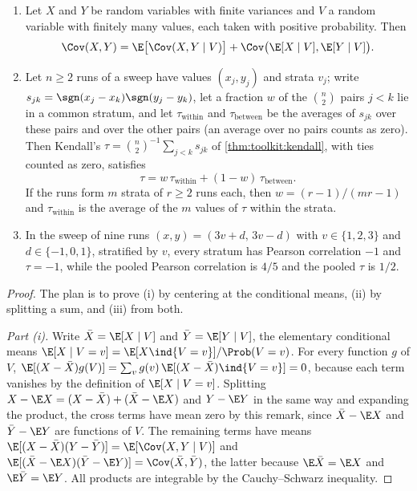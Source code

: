 \begin{refsection}
\begin{proposition}\label{prop:sharpness:simpson}
\begin{enumerate}
\item Let $X$ and $Y$ be random variables with finite variances and $V$ a random variable with finitely many values, each taken with positive probability. Then
\[
\Cov(X,Y)=\E\bigl[\Cov(X,Y\mid V)\bigr]+\Cov\bigl(\E[X\mid V],\E[Y\mid V]\bigr).
\]
\item Let $n\ge2$ runs of a sweep have values $(x_j,y_j)$ and strata $v_j$; write $s_{jk}=\sgn(x_j-x_k)\sgn(y_j-y_k)$, let a fraction $w$ of the $\binom n2$ pairs $j<k$ lie in a common stratum, and let $\tau_{\mathrm{within}}$ and $\tau_{\mathrm{between}}$ be the averages of $s_{jk}$ over these pairs and over the other pairs (an average over no pairs counts as zero). Then Kendall's $\tau=\binom n2^{-1}\sum_{j<k}s_{jk}$ of \cref{thm:toolkit:kendall}, with ties counted as zero, satisfies
\begin{equation}\label{eq:sharpness:pairs}
\tau=w\,\tau_{\mathrm{within}}+(1-w)\,\tau_{\mathrm{between}}.
\end{equation}
If the runs form $m$ strata of $r\ge2$ runs each, then $w=(r-1)/(mr-1)$ and $\tau_{\mathrm{within}}$ is the average of the $m$ values of $\tau$ within the strata.
\item In the sweep of nine runs $(x,y)=(3v+d,\,3v-d)$ with $v\in\{1,2,3\}$ and $d\in\{-1,0,1\}$, stratified by $v$, every stratum has Pearson correlation $-1$ and $\tau=-1$, while the pooled Pearson correlation is $4/5$ and the pooled $\tau$ is $1/2$.
\end{enumerate}
\end{proposition}

\begin{proof}
The plan is to prove (i) by centering at the conditional means, (ii) by splitting a sum, and (iii) from both.

\emph{Part (i).} Write $\bar X=\E[X\mid V]$ and $\bar Y=\E[Y\mid V]$, the elementary conditional means $\E[X\mid V=v]=\E[X\ind\{V=v\}]/\Prob(V=v)$. For every function $g$ of $V$, $\E[(X-\bar X)g(V)]=\sum_vg(v)\,\E[(X-\bar X)\ind\{V=v\}]=0$, because each term vanishes by the definition of $\E[X\mid V=v]$. Splitting $X-\E X=(X-\bar X)+(\bar X-\E X)$ and $Y-\E Y$ in the same way and expanding the product, the cross terms have mean zero by this remark, since $\bar X-\E X$ and $\bar Y-\E Y$ are functions of $V$. The remaining terms have means $\E[(X-\bar X)(Y-\bar Y)]=\E[\Cov(X,Y\mid V)]$ and $\E[(\bar X-\E X)(\bar Y-\E Y)]=\Cov(\bar X,\bar Y)$, the latter because $\E\bar X=\E X$ and $\E\bar Y=\E Y$. All products are integrable by the Cauchy--Schwarz inequality.


\end{proof}
\end{refsection}
